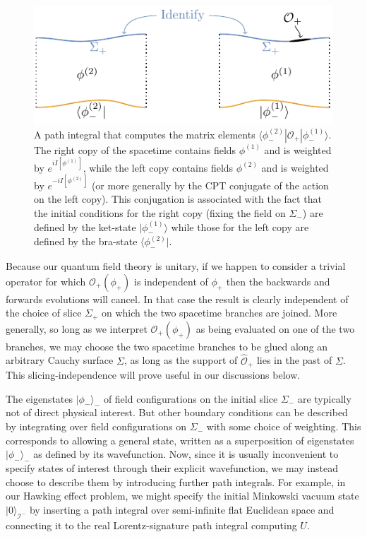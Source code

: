 \documentclass[letterpaper,12pt]{article}
\newcommand*{\scri}{\mathscr{I}} %
\begin{document}
\begin{figure}[h!]
\centering
	\includegraphics[width=.9\textwidth]{ininPI.pdf}
	\caption{A path integral that computes the matrix elements $\langle\phi^{(2)}_-|\mathcal{O}_+|\phi^{(1)}_- \rangle$. The right copy of the spacetime contains fields $\phi^{(1)}$ and is weighted by $e^{iI[\phi^{(1)}]}$, while the left copy contains fields $\phi^{(2)}$ and is weighted by $e^{-iI[\phi^{(2)}]}$ (or more generally by the CPT conjugate of the action on the left copy).   This conjugation is associated with the fact that the initial conditions for the right copy (fixing the field on $\Sigma_-$) are defined by the ket-state $|\phi^{(1)}_- \rangle$ while those for the left copy are defined by the bra-state $\langle \phi^{(2)}_- |$.\label{fig:ininPI}}
\end{figure}


Because our quantum field theory is unitary, if we happen to consider a trivial operator for which $\mathcal{O}_+(\phi_+)$ is independent of $\phi_+$ then the backwards and forwards evolutions will cancel.  In that case the result is clearly independent of the choice of slice $\Sigma_+$ on which the two spacetime branches are joined.  More generally, so long as we interpret
$\mathcal{O}_+(\phi_+)$ as being evaluated on one of the two branches, we may choose the two spacetime branches to be glued along an arbitrary Cauchy surface $\Sigma$, as long as the support of $\hat{\mathcal{O}}_+$ lies in the past of $\Sigma$.
This slicing-independence will prove useful in our discussions below.

The eigenstates $|\phi_-\rangle_-$ of field configurations on the initial slice $\Sigma_-$ are typically not of direct physical interest.  But other boundary conditions can be described by integrating over field configurations on $\Sigma_-$ with some choice of weighting. This corresponds to allowing a general state, written as a superposition of eigenstates $|\phi_-\rangle_-$ as defined by its wavefunction.  Now, since it is usually inconvenient to specify states of interest through their explicit wavefunction, we may instead choose to describe them by introducing further path integrals. For example, in our Hawking effect problem, we might specify the initial Minkowski vacuum state $|0\rangle_{\scri^-}$ by inserting a path integral over semi-infinite flat Euclidean space and connecting it to the real Lorentz-signature path integral computing $U$.
\end{document}
